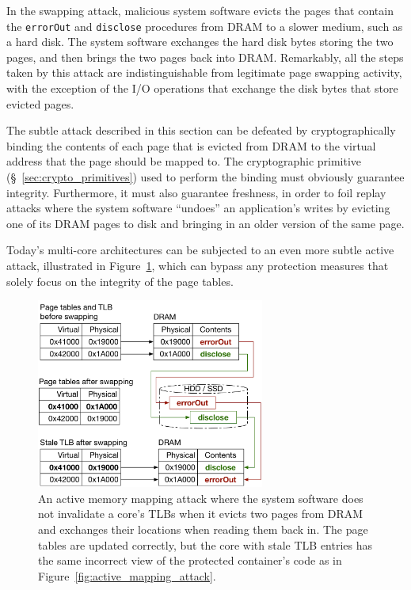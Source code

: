 In the swapping attack, malicious system software evicts the pages that contain
the \texttt{errorOut} and \texttt{disclose} procedures from DRAM to a slower
medium, such as a hard disk. The system software exchanges the hard disk
bytes storing the two pages, and then brings the two pages back into DRAM.
Remarkably, all the steps taken by this attack are indistinguishable from
legitimate page swapping activity, with the exception of the I/O operations
that exchange the disk bytes that store evicted pages.

The subtle attack described in this section can be defeated by
cryptographically binding the contents of each page that is evicted from DRAM
to the virtual address that the page should be mapped to. The cryptographic
primitive (\S~\ref{sec:crypto_primitives}) used to perform the binding must
obviously guarantee integrity. Furthermore, it must also guarantee freshness, in
order to foil replay attacks where the system software ``undoes'' an
application's writes by evicting one of its DRAM pages to disk and bringing in
an older version of the same page.


\label{sec:tlb_mapping_attacks}

Today's multi-core architectures can be subjected to an even more subtle active
attack, illustrated in Figure~\ref{fig:tlb_mapping_attack}, which can bypass
any protection measures that solely focus on the integrity of the page tables.

\begin{figure}[hbt]
  \centering
  \includegraphics[width=75mm]{figures/tlb_mapping_attack.pdf}
  \caption{
    An active memory mapping attack where the system software does not
    invalidate a core's TLBs when it evicts two pages from DRAM and exchanges
    their locations when reading them back in. The page tables are updated
    correctly, but the core with stale TLB entries has the same incorrect view
    of the protected container's code as in
    Figure~\ref{fig:active_mapping_attack}.
  }
  \label{fig:tlb_mapping_attack}
\end{figure}

